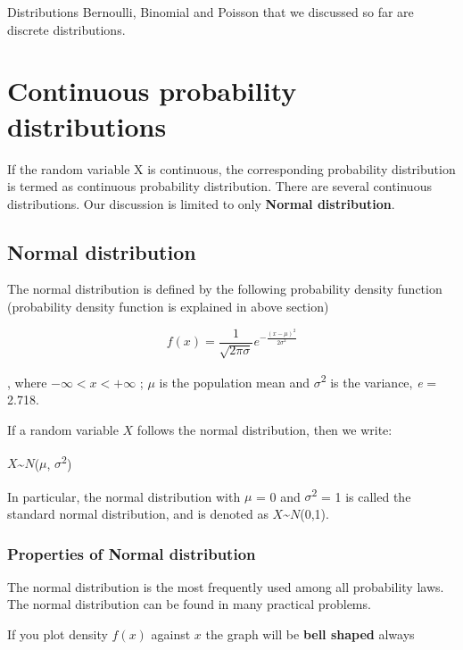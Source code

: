 \documentclass[
]{book}
\begin{document}
Distributions Bernoulli, Binomial and Poisson that we discussed so far
are discrete distributions.

\hypertarget{continuous-probability-distributions}{%
\section{Continuous probability distributions}\label{continuous-probability-distributions}}

If the random variable X is continuous, the corresponding probability
distribution is termed as continuous probability distribution. There are
several continuous distributions. Our discussion is limited to only
\textbf{Normal distribution}.

\hypertarget{normal-distribution}{%
\subsection{Normal distribution}\label{normal-distribution}}

The normal distribution is defined by the following probability density
function (probability density function is explained in above section)

\[f\left( x \right) = \frac{1}{\sqrt{2\pi\sigma}}e^{- \frac{{(x - \mu)}^{2}}{2\sigma^{2}}}\]

, where \(- \infty < x < + \infty\) ; \(μ\) is the population mean and
\(σ\)\textsuperscript{2} is the variance, \emph{e} = 2.718.

If a random variable \(X\) follows the normal distribution, then we write:

\(X\)\textasciitilde{}\(N\)(\(μ\), \(σ\)\textsuperscript{2})

In particular, the normal distribution with \(μ\) = 0 and \(σ\)\textsuperscript{2} = 1 is
called the standard normal distribution, and is denoted as
\(X\)\textasciitilde{}\(N\)(0,1).

\hypertarget{properties-of-normal-distribution}{%
\subsubsection*{Properties of Normal distribution}\label{properties-of-normal-distribution}}

The normal distribution is the most frequently used among all
probability laws. The normal distribution can be found in many practical problems.

If you plot density \(f(x)\) against \(x\) the graph will be \textbf{bell shaped}
always
\end{document}
